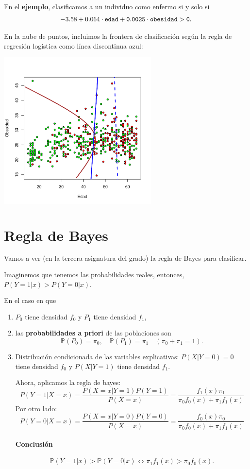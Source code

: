 En el \textbf{ejemplo}, clasificamos a un individuo como enfermo si y solo si
\[
-3.58 + 0.064 \cdot \tt{edad} + 0.0025 \cdot \tt{obesidad} > 0.
\]


En la nube de puntos, incluimos la frontera de clasificación según la regla de regresión logística como línea discontinua azul:

\centerline{\includegraphics[height=8cm]{pdf/tema4/_edadobesidad-reglas-log}}

\section{Regla de Bayes}

Vamos a ver (en la tercera asignatura del grado) la regla de Bayes para clasificar.

Imaginemos que tenemos las probabilidades reales, entonces, $P(Y=1 | x) > P(Y=0 | x)$. 



En el caso en que 
\begin{enumerate}
\item $P_0$ tiene densidad $f_0$ y  $P_1$ tiene densidad $f_1$,
\item las \textbf{probabilidades a priori} de las poblaciones son
$$\mathbb{P}(P_0)=\pi_0,\quad \mathbb{P}(P_1)=\pi_1\quad (\pi_0+\pi_1=1).$$
\item Distribución condicionada de las variables explicativas: $P(X|Y=0) = 0$ tiene densidad $f_0$ y $P(X|Y=1)$ tiene densidad $f_1$.

\subitem Ahora, aplicamos la regla de bayes: \[P(Y=1 | X=x) = \frac{P(X=x|Y=1)P(Y=1)}{P(X=x)} = \frac{f_1(x)π_1}{π_0f_0(x) + π_1f_1(x)}\]
Por otro lado:
\[P(Y=0 | X=x) = \frac{P(X=x|Y=0)P(Y=0)}{P(X=x)} = \frac{f_0(x)π_0}{π_0f_0(x) + π_1f_1(x)}\]

\paragraph{Conclusión}
\[
\mathbb{P}(Y=1|x)>\mathbb{P}(Y=0|x) \Leftrightarrow \pi_1 f_1(x)>\pi_0 f_0(x).
\]
\end{enumerate}

